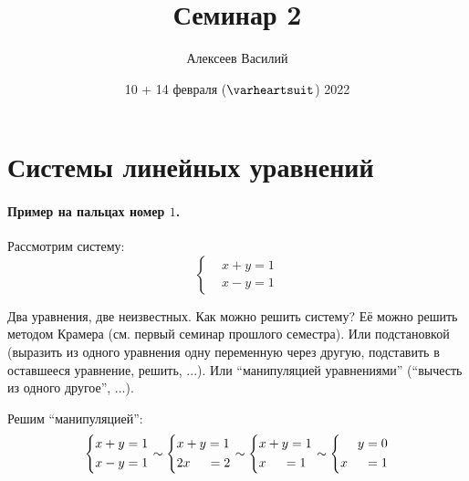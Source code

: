 \documentclass[a4paper,12pt]{article}
\author{Алексеев Василий}
\title{Семинар 2}
\date{10 + 14 февраля ($\heart$) 2022}
\begin{document}
  \maketitle
  
  \tableofcontents

  \thispagestyle{empty}
  
  \newpage
  


  \section{Системы линейных уравнений}
  
  \paragraph{Пример на пальцах номер $1$.}
  
  Рассмотрим систему:
  \[
    \left\{ \begin{aligned}
      &x + y = 1\\
      &x - y = 1
    \end{aligned} \right.
  \]
  
  Два уравнения, две неизвестных.
  Как можно решить систему?
  Её можно решить методом Крамера (см. первый семинар прошлого семестра).
  Или подстановкой (выразить из одного уравнения одну переменную через другую, подставить в оставшееся уравнение, решить, ...).
  Или ``манипуляцией уравнениями'' (``вычесть из одного другое'', ...).
  
  Решим ``манипуляцией'':
  \[
    \left\{
      \begin{aligned}
        &x + y = 1\\
        &x - y = 1
      \end{aligned}
    \right.
    \sim \left\{
      \begin{aligned}
        &x + y = 1\\
        &2x \hphantom{+ y} = 2
      \end{aligned}
    \right. 
    \sim \left\{
      \begin{aligned}
        &x + y = 1\\
        &x \hphantom{+ y} = 1
      \end{aligned}
    \right.
    \sim \left\{
      \begin{aligned}
        &\hphantom{x + } y = 0\\
        &x \hphantom{+ y} = 1
      \end{aligned}
    \right.
  \]
  
\end{document}
